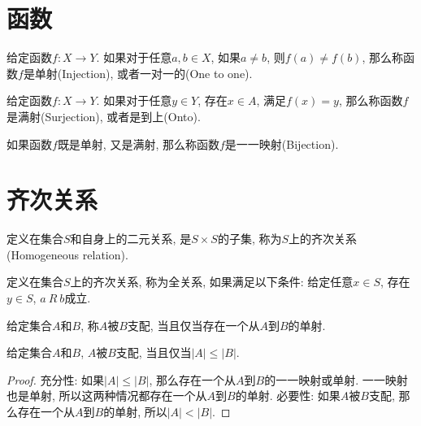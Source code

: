 \section{函数}
\begin{definition}[单射]
	给定函数$f\colon X\rightarrow Y$. 如果对于任意$a,b\in X$, 如果$a\neq b$, 则$f(a)\neq f(b)$, 那么称函数$f$是单射(Injection), 或者一对一的(One to one).
\end{definition}

\begin{definition}[满射]
	给定函数$f\colon X\rightarrow Y$. 如果对于任意$y\in Y$, 存在$x\in A$, 满足$f(x)=y$, 那么称函数$f$是满射(Surjection), 或者是到上(Onto).
\end{definition}

\begin{definition}[一一映射]
	如果函数$f$既是单射, 又是满射, 那么称函数$f$是一一映射(Bijection).
\end{definition}

\section{齐次关系}
\begin{definition}[齐次关系]
	定义在集合$S$和自身上的二元关系, 是$S\times S$的子集, 称为$S$上的齐次关系(Homogeneous relation).
\end{definition}

\begin{definition}[全关系]
	定义在集合$S$上的齐次关系, 称为全关系, 如果满足以下条件: 给定任意$x\in S$, 存在$y\in S$, $a\ R\ b$成立.
\end{definition}

\begin{definition}[支配]
	给定集合$A$和$B$, 称$A$被$B$支配, 当且仅当存在一个从$A$到$B$的单射.
\end{definition}

\begin{proposition}
	给定集合$A$和$B$, $A$被$B$支配, 当且仅当$|A|\leqslant|B|$.
\end{proposition}

\begin{proof}
	充分性: 如果$|A|\leqslant|B|$, 那么存在一个从$A$到$B$的一一映射或单射. 一一映射也是单射, 所以这两种情况都存在一个从$A$到$B$的单射.
	必要性: 如果$A$被$B$支配, 那么存在一个从$A$到$B$的单射, 所以$|A|<|B|$.
\end{proof}